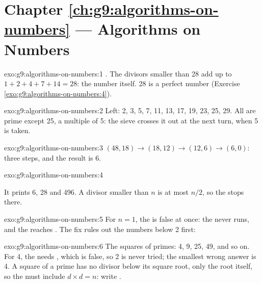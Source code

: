 \section*{Chapter \ref{ch:g9:algorithms-on-numbers} --- Algorithms on Numbers}

\begin{solution}{exo:g9:algorithms-on-numbers:1}
\code{[1, 2, 4, 7, 14, 28]}. The divisors smaller than 28 add up to
$1 + 2 + 4 + 7 + 14 = 28$: the number itself. 28 is a perfect number
(Exercise \ref{exo:g9:algorithms-on-numbers:4}).
\end{solution}

\begin{solution}{exo:g9:algorithms-on-numbers:2}
Left: 2, 3, 5, 7, 11, 13, 17, 19, 23, 25, 29. All are prime except 25, a
multiple of 5: the sieve crosses it out at the next turn, when 5 is taken.
\end{solution}

\begin{solution}{exo:g9:algorithms-on-numbers:3}
$(48, 18) \to (18, 12) \to (12, 6) \to (6, 0)$: three steps, and the result is 6.
\end{solution}

\begin{solution}{exo:g9:algorithms-on-numbers:4}
\label{lst:g9:algorithms-on-numbers:sol-perfect}

It prints 6, 28 and 496. A divisor smaller than $n$ is at most $n / 2$, so the
 stops there.
\end{solution}

\begin{solution}{exo:g9:algorithms-on-numbers:5}
For $n = 1$, the   is false at once: the  never
runs, and the  reaches . The fix rules out the numbers
below 2 first:

\label{lst:g9:algorithms-on-numbers:sol-one}
\end{solution}

\begin{solution}{exo:g9:algorithms-on-numbers:6}
The squares of primes: 4, 9, 25, 49, and so on. For 4, the  needs
, which is false, so 2 is never tried; the smallest wrong answer
is 4. A square of a prime has no divisor below its square root, only the root
itself, so the  must include $d \times d = n$: write .
\end{solution}

